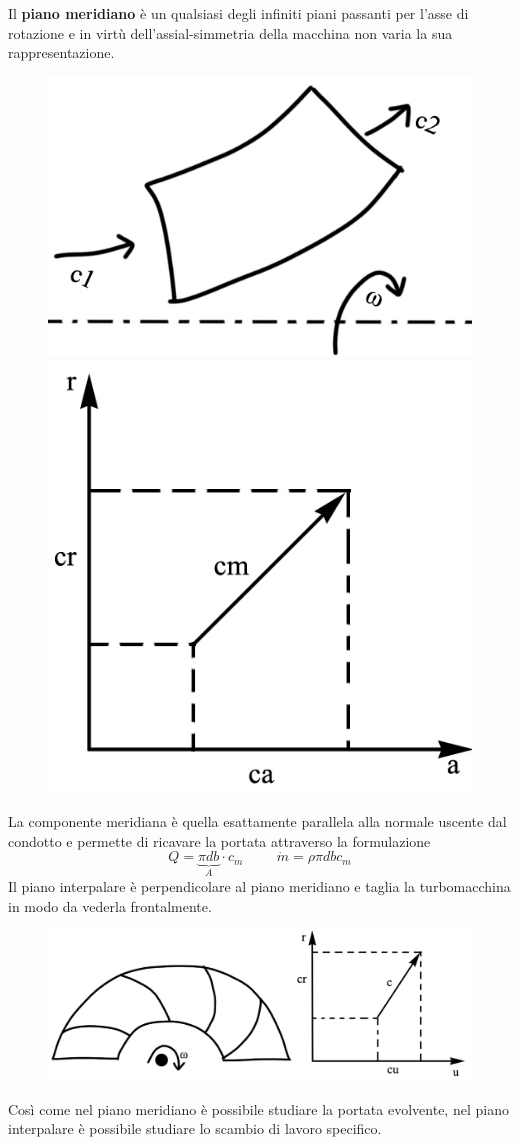 \documentclass[a4paper, 15pt]{article}
\begin{document}
\begin{adjustwidth}{2in}{}
	Il \textbf{piano meridiano} è un qualsiasi degli infiniti piani passanti per l'asse di rotazione e in virtù dell'assial-simmetria della macchina non varia la sua rappresentazione.	
\begin{figure}[H]
	\centering
	\includegraphics[width=0.3\linewidth]{immagini/scan1}
	\label{fig:scan1}
	\includegraphics[width=0.3\linewidth]{immagini/scan2}
	\label{fig:scan2}
\end{figure}
	La componente meridiana è quella esattamente parallela alla normale uscente dal condotto e permette di ricavare la portata attraverso la formulazione
	\[Q = \underbrace{\pi db}_{A}\cdot c_m \hspace{1cm} \dot{m} = \rho\pi db c_m
	\]	
	Il piano interpalare è perpendicolare al piano meridiano e taglia la turbomacchina in modo da vederla frontalmente. 	
\begin{figure}[H]
	\centering
	\includegraphics[width=0.5\linewidth]{immagini/scan3}
	\label{fig:scan3}
\end{figure}
	Così come nel piano meridiano è possibile studiare la portata evolvente, nel piano interpalare è possibile studiare lo scambio di lavoro specifico. \newline
\end{adjustwidth}
\end{document}
